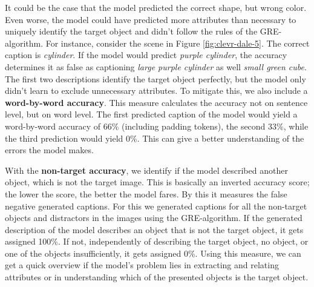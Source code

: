 It could be the case that the model predicted the correct shape, but wrong color.
Even worse, the model could have predicted more attributes than necessary to uniquely identify the target object and didn't follow the rules of the GRE-algorithm.
For instance, consider the scene in Figure \ref{fig:clevr-dale-5}.
The correct caption is \emph{cylinder}.
If the model would predict \emph{purple cylinder}, the accuracy determines it as false as captioning \emph{large purple cylinder} as well \emph{small green cube}.
The first two descriptions identify the target object perfectly, but the model only didn't learn to exclude unnecessary attributes.
To mitigate this, we also include a \textbf{word-by-word accuracy}.
This measure calculates the accuracy not on sentence level, but on word level.
The first predicted caption of the model would yield a word-by-word accuracy of 66\% (including padding tokens), the second 33\%, while the third prediction would yield 0\%.
This can give a better understanding of the errors the model makes.

With the \textbf{non-target accuracy}, we identify if the model described another object, which is not the target image.
This is basically an inverted accuracy score; the lower the score, the better the model fares.
By this it measures the false negative generated captions.
For this we generated captions for all the non-target objects and distractors in the images using the GRE-algorithm.
If the generated description of the model describes an object that is not the target object, it gets assigned 100\%.
If not, independently of describing the target object, no object, or one of the objects insufficiently, it gets assigned 0\%.
Using this measure, we can get a quick overview if the model's problem lies in extracting and relating attributes or in understanding which of the presented objects is the target object.

